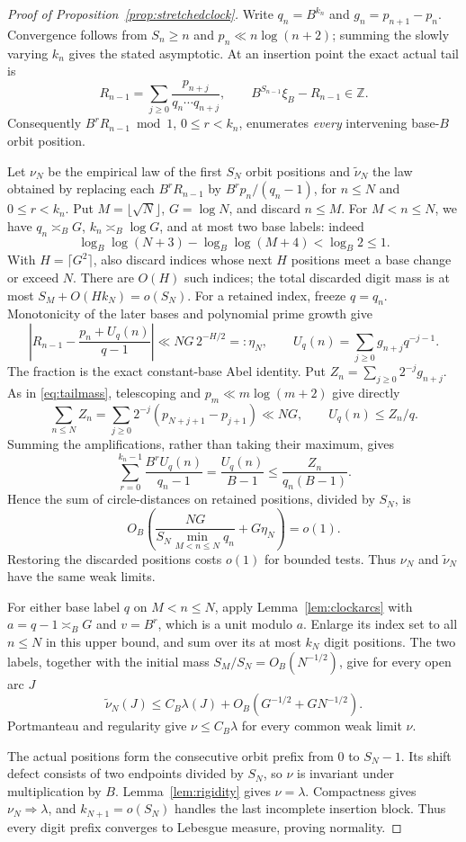 \documentclass[11pt,a4paper]{article}
\newcommand{\Z}{\mathbb Z}
\begin{document}
\begin{proof}[Proof of Proposition~\ref{prop:stretchedclock}]
Write $q_n=B^{k_n}$ and $g_n=p_{n+1}-p_n$.
Convergence follows from $S_n\ge n$ and
$p_n\ll n\log(n+2)$; summing the slowly varying $k_n$ gives the
stated asymptotic. At an insertion point the exact actual tail is
\[
 R_{n-1}=\sum_{j\ge0}\frac{p_{n+j}}{q_n\cdots q_{n+j}},\qquad
 B^{S_{n-1}}\xi_B-R_{n-1}\in\Z.
\]
Consequently $B^rR_{n-1}\bmod1$, $0\le r<k_n$, enumerates
\emph{every} intervening base-$B$ orbit position.

Let $\nu_N$ be the empirical law of the first $S_N$ orbit positions and
$\widetilde\nu_N$ the law obtained by replacing each $B^rR_{n-1}$ by
$B^rp_n/(q_n-1)$, for $n\le N$ and $0\le r<k_n$.
Put $M=\lfloor\sqrt N\rfloor$, $G=\log N$, and discard $n\le M$.
For $M<n\le N$, we have $q_n\asymp_B G$, $k_n\asymp_B\log G$,
and at most two base labels: indeed
\[
 \log_B\log(N+3)-\log_B\log(M+4)<\log_B2\le1.
\]
With $H=\lceil G^2\rceil$, also discard indices whose next $H$
positions meet a base change or exceed $N$. There are $O(H)$ such
indices; the total discarded digit mass is at most
$S_M+O(Hk_N)=o(S_N)$.
For a retained index, freeze $q=q_n$. Monotonicity of the later bases
and polynomial prime growth give
\[
 \left|R_{n-1}-\frac{p_n+U_q(n)}{q-1}\right|
 \ll NG\,2^{-H/2}=:\eta_N,\qquad
 U_q(n)=\sum_{j\ge0}g_{n+j}q^{-j-1}.
\]
The fraction is the exact constant-base Abel identity. Put
$Z_n=\sum_{j\ge0}2^{-j}g_{n+j}$. As in \eqref{eq:tailmass},
telescoping and $p_m\ll m\log(m+2)$ give directly
\[
 \sum_{n\le N}Z_n
 =\sum_{j\ge0}2^{-j}(p_{N+j+1}-p_{j+1})\ll NG,
 \qquad U_q(n)\le Z_n/q.
\]
Summing the amplifications, rather than taking their maximum, gives
\[
 \sum_{r=0}^{k_n-1}\frac{B^rU_q(n)}{q_n-1}
       =\frac{U_q(n)}{B-1}\le\frac{Z_n}{q_n(B-1)}.
\]
Hence the sum of circle-distances on retained positions, divided by
$S_N$, is
\[
 O_B\!\left(\frac{NG}{S_N\min_{M<n\le N}q_n}+G\eta_N\right)=o(1).
\]
Restoring the discarded positions costs $o(1)$ for bounded tests.
Thus $\nu_N$ and $\widetilde\nu_N$ have the same weak limits.

For either base label $q$ on $M<n\le N$, apply
Lemma~\ref{lem:clockarcs} with $a=q-1\asymp_B G$ and $v=B^r$,
which is a unit modulo $a$. Enlarge its index set to all $n\le N$
in this upper bound, and sum over its at most $k_N$ digit positions.
The two labels, together with the initial mass $S_M/S_N=O_B(N^{-1/2})$,
give for every open arc $J$
\[
 \widetilde\nu_N(J)
 \le C_B\lambda(J)+O_B\!\left(G^{-1/2}+G N^{-1/2}\right).
\]
Portmanteau and regularity give
$\nu\le C_B\lambda$ for every common weak limit $\nu$.

The actual positions form the consecutive orbit prefix from $0$ to
$S_N-1$. Its shift defect consists of two endpoints divided by $S_N$,
so $\nu$ is invariant under multiplication
by $B$. Lemma~\ref{lem:rigidity} gives $\nu=\lambda$.
Compactness gives $\nu_N\Rightarrow\lambda$, and $k_{N+1}=o(S_N)$
handles the last incomplete insertion block. Thus every digit prefix
converges to Lebesgue measure, proving normality.
\end{proof}
\end{document}
